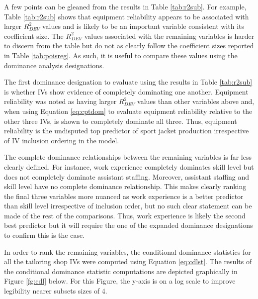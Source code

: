 \documentclass[ShortAfour,times,sageapa]{sagej}
\begin{document}
	A few points can be gleaned from the results in Table \ref{tab:r2sub}. 
	For example, Table \ref{tab:r2sub} shows that equipment reliability appears to be associated with larger $R^2_{DEV}$ values and is likely to be an important variable consistent with its coefficient size. 
	The $R^2_{DEV}$ values associated with the remaining variables is harder to discern from the table but do not as clearly follow the coefficient sizes reported in Table \ref{tab:poisreg}.
	As such, it is useful to compare these values using the dominance analysis designations.
	
	The first dominance designation to evaluate using the results in Table \ref{tab:r2sub} is whether IVs show evidence of completely dominating one another.
	Equipment reliability was noted as having larger $R^2_{DEV}$ values than other variables above and, when using Equation \ref{eq:cptdom} to evaluate equipment reliability relative to the other three IVs, is shown to completely dominate all three.
	Thus, equipment reliability is the undisputed top predictor of sport jacket production irrespective of IV inclusion ordering in the model.	
	
	The complete dominance relationships between the remaining variables is far less clearly defined. 
	For instance, work experience completely dominates skill level but does not completely dominate assistant staffing.
	Moreover, assistant staffing and skill level have no complete dominance relationship.
	This makes clearly ranking the final three variables more nuanced as work experience is a better predictor than skill level irrespective of inclusion order, but no such clear statement can be made of the rest of the comparisons.
	Thus, work experience is likely the second best predictor but it will require the one of the expanded dominance designations to confirm this is the case.
	
	In order to rank the remaining variables, the conditional dominance statistics for all the tailoring shop IVs were computed using Equation \ref{eq:cdlst}.
	The results of the conditional dominance statistic computations are depicted graphically in Figure \ref{fg:cdl} below.
	For this Figure, the y-axis is on a log scale to improve legibility nearer subsets sizes of 4.
	
\end{document}
